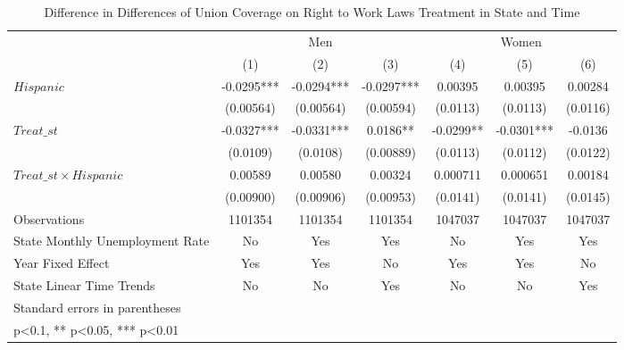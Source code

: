 \begin{table}[htbp]\centering
\def\sym#1{\ifmmode^{#1}\else\(^{#1}\)\fi}
\caption{Difference in Differences of Union Coverage on Right to Work Laws Treatment in State and Time}
\begin{tabular}{l*{6}{c}}
\hline\hline
                    &\multicolumn{3}{c}{Men}                        &\multicolumn{3}{c}{Women}                      \\\cmidrule(lr){2-4}\cmidrule(lr){5-7}
                    &\multicolumn{1}{c}{(1)}   &\multicolumn{1}{c}{(2)}   &\multicolumn{1}{c}{(3)}   &\multicolumn{1}{c}{(4)}   &\multicolumn{1}{c}{(5)}   &\multicolumn{1}{c}{(6)}   \\
\hline
$ Hispanic $        &     -0.0295***&     -0.0294***&     -0.0297***&     0.00395   &     0.00395   &     0.00284   \\
                    &   (0.00564)   &   (0.00564)   &   (0.00594)   &    (0.0113)   &    (0.0113)   &    (0.0116)   \\
[1em]
$ Treat\_{st} $      &     -0.0327***&     -0.0331***&      0.0186** &     -0.0299** &     -0.0301***&     -0.0136   \\
                    &    (0.0109)   &    (0.0108)   &   (0.00889)   &    (0.0113)   &    (0.0112)   &    (0.0122)   \\
[1em]
$ Treat\_{st} \times Hispanic $&     0.00589   &     0.00580   &     0.00324   &    0.000711   &    0.000651   &     0.00184   \\
                    &   (0.00900)   &   (0.00906)   &   (0.00953)   &    (0.0141)   &    (0.0141)   &    (0.0145)   \\
\hline
Observations        &     1101354   &     1101354   &     1101354   &     1047037   &     1047037   &     1047037   \\
State Monthly Unemployment Rate&          No   &         Yes   &         Yes   &          No   &         Yes   &         Yes   \\
Year Fixed Effect   &         Yes   &         Yes   &          No   &         Yes   &         Yes   &          No   \\
State Linear Time Trends&          No   &          No   &         Yes   &          No   &          No   &         Yes   \\
\hline\hline
\multicolumn{7}{l}{\footnotesize Standard errors in parentheses}\\
\multicolumn{7}{l}{\footnotesize * p<0.1, ** p<0.05, *** p<0.01}\\
\end{tabular}
\end{table}
